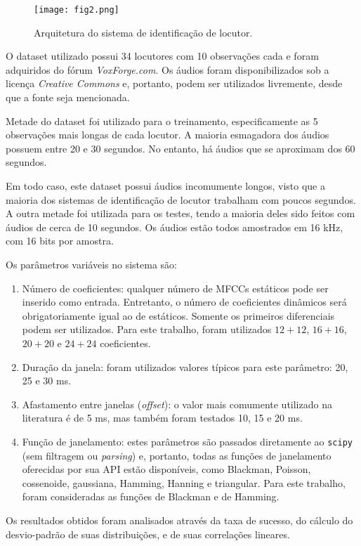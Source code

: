 \documentclass[12pt]{diazessay} %
\begin{document}
\begin{figure}
	\centering
	\texttt{[image: fig2.png]}
	\caption{Arquitetura do sistema de identificação de locutor.}
\end{figure}

O dataset utilizado possui 34 locutores com 10 observações cada e foram adquiridos do fórum \emph{VoxForge.com}.
Os áudios foram disponibilizados sob a licença \emph{Creative Commons} e, portanto, podem ser utilizados livremente, desde que a fonte seja mencionada.

Metade do dataset foi utilizado para o treinamento, especificamente as 5 observações mais longas de cada locutor.
A maioria esmagadora dos áudios possuem entre 20 e 30 segundos.
No entanto, há áudios que se aproximam dos 60 segundos.

Em todo caso, este dataset possui áudios incomumente longos, visto que a maioria dos sistemas de identificação de locutor trabalham com poucos segundos.
A outra metade foi utilizada para os testes, tendo a maioria deles sido feitos com áudios de cerca de 10 segundos.
Os áudios estão todos amostrados em 16 kHz, com 16 bits por amostra.

Os parâmetros variáveis no sistema são:

\begin{enumerate}
	\item Número de coeficientes: qualquer número de MFCCs estáticos pode ser inserido como entrada. Entretanto, o número de coeficientes dinâmicos será obrigatoriamente igual ao de estáticos. Somente os primeiros diferenciais podem ser utilizados. Para este trabalho, foram utilizados $12 + 12$, $16 + 16$, $20 + 20$ e $24 + 24$ coeficientes.
	\item Duração da janela: foram utilizados valores típicos para este parâmetro: 20, 25 e 30 ms.
	\item Afastamento entre janelas (\emph{offset}): o valor mais comumente utilizado na literatura é de 5 ms, mas também foram testados 10, 15 e 20 ms.
	\item Função de janelamento: estes parâmetros são passados diretamente ao \texttt{scipy} (sem filtragem ou \emph{parsing}) e, portanto, todas as funções de janelamento oferecidas por sua API estão disponíveis, como Blackman, Poisson, cossenoide, gaussiana, Hamming, Hanning e triangular. Para este trabalho, foram consideradas as funções de Blackman e de Hamming.
\end{enumerate}

Os resultados obtidos foram analisados através da taxa de sucesso, do cálculo do desvio-padrão de suas distribuições, e de suas correlações lineares. 
\end{document}
